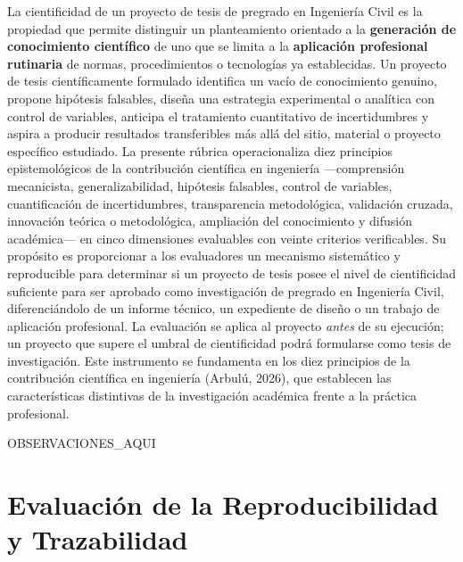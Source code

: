 \documentclass[12pt,a4paper]{report}
\begin{document}
La cientificidad de un proyecto de tesis de pregrado en Ingeniería Civil es la propiedad que permite distinguir un planteamiento orientado a la \textbf{generación de conocimiento científico} de uno que se limita a la \textbf{aplicación profesional rutinaria} de normas, procedimientos o tecnologías ya establecidas. Un proyecto de tesis científicamente formulado identifica un vacío de conocimiento genuino, propone hipótesis falsables, diseña una estrategia experimental o analítica con control de variables, anticipa el tratamiento cuantitativo de incertidumbres y aspira a producir resultados transferibles más allá del sitio, material o proyecto específico estudiado. La presente rúbrica operacionaliza diez principios epistemológicos de la contribución científica en ingeniería ---comprensión mecanicista, generalizabilidad, hipótesis falsables, control de variables, cuantificación de incertidumbres, transparencia metodológica, validación cruzada, innovación teórica o metodológica, ampliación del conocimiento y difusión académica--- en cinco dimensiones evaluables con veinte criterios verificables. Su propósito es proporcionar a los evaluadores un mecanismo sistemático y reproducible para determinar si un proyecto de tesis posee el nivel de cientificidad suficiente para ser aprobado como investigación de pregrado en Ingeniería Civil, diferenciándolo de un informe técnico, un expediente de diseño o un trabajo de aplicación profesional. La evaluación se aplica al proyecto \textit{antes} de su ejecución; un proyecto que supere el umbral de cientificidad podrá formularse como tesis de investigación. Este instrumento se fundamenta en los diez principios de la contribución científica en ingeniería (Arbulú, 2026), que establecen las características distintivas de la investigación académica frente a la práctica profesional.


{{OBSERVACIONES_AQUI}}


\section{Evaluación de la Reproducibilidad y Trazabilidad}
\end{document}
